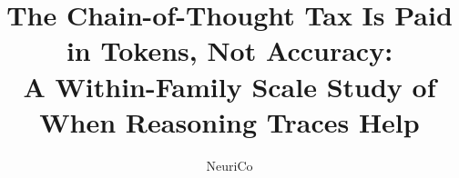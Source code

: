 \documentclass{article}
\title{The Chain-of-Thought Tax Is Paid in Tokens, Not Accuracy:\\A Within-Family Scale Study of When Reasoning Traces Help}
\author{NeuriCo}
\begin{document}
\maketitle

\begin{abstract}

\end{abstract}










\appendix

\end{document}
